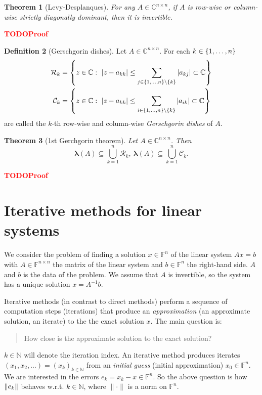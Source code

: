 \documentclass[12pt]{article}
\newcounter{lecture}
\newtheorem{theorem}{Theorem}[lecture]
\theoremstyle{definition}
\newtheorem{definition}[theorem]{Definition}
\theoremstyle{remark}
\numberwithin{equation}{section}
\newcommand{\F}{\mathbb{F}}
\newcommand{\C}{\mathbb{C}}
\newcommand{\N}{\mathbb{N}}
\newcommand{\normempty}{\|\cdot\|}
\newcommand{\spectrum}[1]{\bm{\lambda}(#1)}
\newcommand{\TODO}[1][]{\textcolor{red}{\textbf{TODO\ifblank{#1}{}{:\ }#1}}\\}
\DeclarePairedDelimiter{\norm}{\lVert}{\rVert}
\DeclarePairedDelimiter{\set}{\{}{\}}
\begin{document}
\begin{theorem}[Levy-Desplanques]
  For any $A \in \C^{n \times n}$, if $A$ is row-wise or column-wise strictly diagonally dominant, then it is invertible.
\end{theorem}
\TODO[Proof]

\begin{definition}[Gerschgorin dishes]
  Let $A \in \C^{n \times n}$. For each $k \in \set{1,\ldots, n}$
  \begin{align*}
    \mathcal{R}_k &= \set*{z \in \C:\ |z-a_{kk}| \leq \sum_{j \in \set{1,\ldots,n} \setminus \set{k}} |a_{kj}|\subset \C} \\
    \mathcal{C}_k &= \set*{z \in \C:\ |z-a_{kk}| \leq \sum_{i \in \set{1,\ldots,n} \setminus \set{k}} |a_{ik}|\subset \C}
  \end{align*}
  are called the $k$-th row-wise and column-wise \emph{Gerschgorin dishes} of $A$.
\end{definition}

\begin{theorem}[1st Gerchgorin theorem]
  Let $A \in \C^{n \times n}$. Then
  \begin{equation*}
    \spectrum{A} \subseteq \bigcup_{k=1}^n \mathcal{R}_k,\ \spectrum{A}\subseteq\bigcup_{k=1}^n \mathcal{C}_k.
  \end{equation*}
\end{theorem}
\TODO[Proof]

\section{Iterative methods for linear systems}
We consider the problem of finding a solution $x \in \F^n$ of the linear system $Ax = b$ with $A \in \F^{n \times n}$ the matrix of the linear system and $b \in \F^n$ the right-hand side. $A$ and $b$ is the data of the problem. We assume that $A$ is invertible, so the system has a unique solution $x = A^{-1}b$.

Iterative methods (in contrast to direct methods) perform a sequence of computation steps (iterations) that produce an \emph{approximation} (an approximate solution, an iterate) to the the exact solution $x$. The main question is:
\begin{quote}
  How close is the approximate solution to the exact solution?
\end{quote}

$k \in \N$ will denote the iteration index. An iterative method produces iterates $(x_1,x_2,\ldots) = (x_k)_{k \in \N}$ from an \emph{initial guess} (initial approximation) $x_0 \in \F^n$. We are interested in the errors $e_k = x_k - x \in \F^n$. So the above question is how $\norm{e_k}$ behaves w.r.t. $k\in \N$, where $\normempty$ is a norm on $\F^n$.
\end{document}
